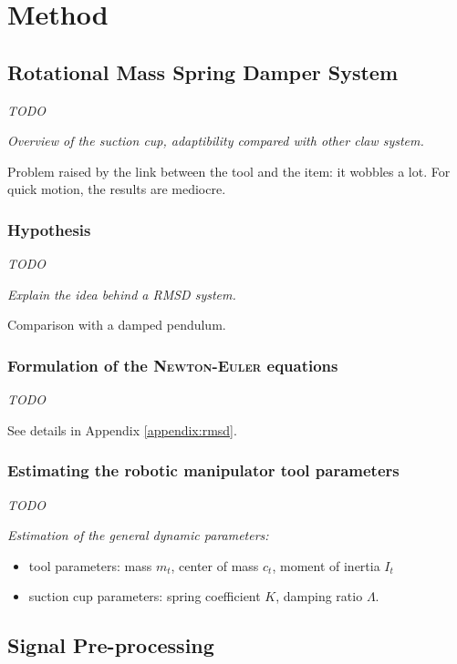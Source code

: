 \documentclass[/home/francois/latex/report/main.tex]{subfiles}
\begin{document}
\chapter{Method}
\label{chapter:method}

\section{Rotational Mass Spring Damper System}

\textit{TODO}

{\it
Overview of the suction cup, adaptibility compared with other claw system.

Problem raised by the link between the tool and the item: it wobbles a lot. For quick motion, the results are mediocre.
}

\subsection{Hypothesis}

\textit{TODO}

{\it
Explain the idea behind a \ac{RMSD} system.

Comparison with a damped pendulum.
}

\subsection{Formulation of the \textsc{Newton-Euler} equations}
\label{subsection:method_newton_equation}

\textit{TODO}

See details in Appendix \ref{appendix:rmsd}.

\subsection{Estimating the robotic manipulator tool parameters}

\textit{TODO}

{\it
Estimation of the general dynamic parameters:

\begin{itemize}
  \item tool parameters: mass $m_t$, center of mass $c_t$, moment of inertia $I_t$
  \item suction cup parameters: spring coefficient $K$, damping ratio $\Lambda$.
\end{itemize}
}

\section{Signal Pre-processing}
\end{document}
